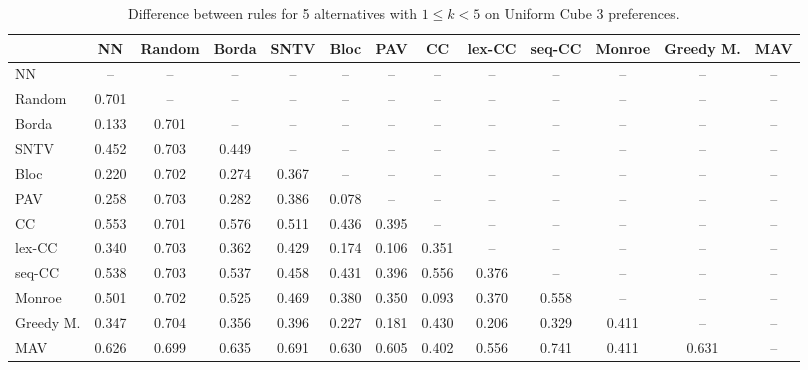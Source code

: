 
\begin{table*}[htbp]
\centering
\begin{tabular}{lcccccccccccc}
\toprule
 & NN & Random & Borda & SNTV & Bloc & PAV & CC & lex-CC & seq-CC & Monroe & Greedy M. & MAV \\
\midrule
NN & -- & -- & -- & -- & -- & -- & -- & -- & -- & -- & -- & -- \\
Random & \cellcolor{blue!70} 0.701 & -- & -- & -- & -- & -- & -- & -- & -- & -- & -- & -- \\
Borda & \cellcolor{blue!13} 0.133 & \cellcolor{blue!70} 0.701 & -- & -- & -- & -- & -- & -- & -- & -- & -- & -- \\
SNTV & \cellcolor{blue!45} 0.452 & \cellcolor{blue!70} 0.703 & \cellcolor{blue!44} 0.449 & -- & -- & -- & -- & -- & -- & -- & -- & -- \\
Bloc & \cellcolor{blue!22} 0.220 & \cellcolor{blue!70} 0.702 & \cellcolor{blue!27} 0.274 & \cellcolor{blue!36} 0.367 & -- & -- & -- & -- & -- & -- & -- & -- \\
PAV & \cellcolor{blue!25} 0.258 & \cellcolor{blue!70} 0.703 & \cellcolor{blue!28} 0.282 & \cellcolor{blue!38} 0.386 & \cellcolor{blue!7} 0.078 & -- & -- & -- & -- & -- & -- & -- \\
CC & \cellcolor{blue!55} 0.553 & \cellcolor{blue!70} 0.701 & \cellcolor{blue!57} 0.576 & \cellcolor{blue!51} 0.511 & \cellcolor{blue!43} 0.436 & \cellcolor{blue!39} 0.395 & -- & -- & -- & -- & -- & -- \\
lex-CC & \cellcolor{blue!34} 0.340 & \cellcolor{blue!70} 0.703 & \cellcolor{blue!36} 0.362 & \cellcolor{blue!42} 0.429 & \cellcolor{blue!17} 0.174 & \cellcolor{blue!10} 0.106 & \cellcolor{blue!35} 0.351 & -- & -- & -- & -- & -- \\
seq-CC & \cellcolor{blue!53} 0.538 & \cellcolor{blue!70} 0.703 & \cellcolor{blue!53} 0.537 & \cellcolor{blue!45} 0.458 & \cellcolor{blue!43} 0.431 & \cellcolor{blue!39} 0.396 & \cellcolor{blue!55} 0.556 & \cellcolor{blue!37} 0.376 & -- & -- & -- & -- \\
Monroe & \cellcolor{blue!50} 0.501 & \cellcolor{blue!70} 0.702 & \cellcolor{blue!52} 0.525 & \cellcolor{blue!46} 0.469 & \cellcolor{blue!38} 0.380 & \cellcolor{blue!35} 0.350 & \cellcolor{blue!9} 0.093 & \cellcolor{blue!37} 0.370 & \cellcolor{blue!55} 0.558 & -- & -- & -- \\
Greedy M. & \cellcolor{blue!34} 0.347 & \cellcolor{blue!70} 0.704 & \cellcolor{blue!35} 0.356 & \cellcolor{blue!39} 0.396 & \cellcolor{blue!22} 0.227 & \cellcolor{blue!18} 0.181 & \cellcolor{blue!43} 0.430 & \cellcolor{blue!20} 0.206 & \cellcolor{blue!32} 0.329 & \cellcolor{blue!41} 0.411 & -- & -- \\
MAV & \cellcolor{blue!62} 0.626 & \cellcolor{blue!69} 0.699 & \cellcolor{blue!63} 0.635 & \cellcolor{blue!69} 0.691 & \cellcolor{blue!63} 0.630 & \cellcolor{blue!60} 0.605 & \cellcolor{blue!40} 0.402 & \cellcolor{blue!55} 0.556 & \cellcolor{blue!74} 0.741 & \cellcolor{blue!41} 0.411 & \cellcolor{blue!63} 0.631 & -- \\
\bottomrule
\end{tabular}

\caption{Difference between rules for 5 alternatives with $1 \leq k < 5$ on Uniform Cube 3 preferences.}
\label{tab:rule_distance_heatmap-m=[5]-pref_dist=euclidean__args__dimensions=3_-_space=uniform_cube}
\end{table*}
    